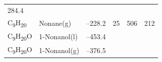 \documentclass[
  9pt,
]{extbook}
\theoremstyle{definition}
\theoremstyle{definition}
\theoremstyle{definition}
\theoremstyle{remark}
\begin{document}
\begin{longtable}[]{@{}llllll@{}}
\begin{minipage}[t]{0.14\columnwidth}
284.4\strut
\end{minipage}\tabularnewline
\begin{minipage}[t]{0.07\columnwidth}\raggedright
C\textsubscript{9}H\textsubscript{20}\strut
\end{minipage} & \begin{minipage}[t]{0.17\columnwidth}\raggedright
Nonane(g)\strut
\end{minipage} & \begin{minipage}[t]{0.15\columnwidth}\raggedright
--228.2\strut
\end{minipage} & \begin{minipage}[t]{0.15\columnwidth}\raggedright
25\strut
\end{minipage} & \begin{minipage}[t]{0.14\columnwidth}\raggedright
506\strut
\end{minipage} & \begin{minipage}[t]{0.14\columnwidth}\raggedright
212\strut
\end{minipage}\tabularnewline
\begin{minipage}[t]{0.07\columnwidth}\raggedright
C\textsubscript{9}H\textsubscript{20}O\strut
\end{minipage} & \begin{minipage}[t]{0.17\columnwidth}\raggedright
1-Nonanol(l)\strut
\end{minipage} & \begin{minipage}[t]{0.15\columnwidth}\raggedright
--453.4\strut
\end{minipage} & \begin{minipage}[t]{0.15\columnwidth}\raggedright
\strut
\end{minipage} & \begin{minipage}[t]{0.14\columnwidth}\raggedright
\strut
\end{minipage} & \begin{minipage}[t]{0.14\columnwidth}\raggedright
\strut
\end{minipage}\tabularnewline
\begin{minipage}[t]{0.07\columnwidth}\raggedright
C\textsubscript{9}H\textsubscript{20}O\strut
\end{minipage} & \begin{minipage}[t]{0.17\columnwidth}\raggedright
1-Nonanol(g)\strut
\end{minipage} & \begin{minipage}[t]{0.15\columnwidth}\raggedright
--376.5\strut
\end{minipage} & \begin{minipage}[t]{0.15\columnwidth}\raggedright

\end{minipage}
\end{longtable}
\end{document}
